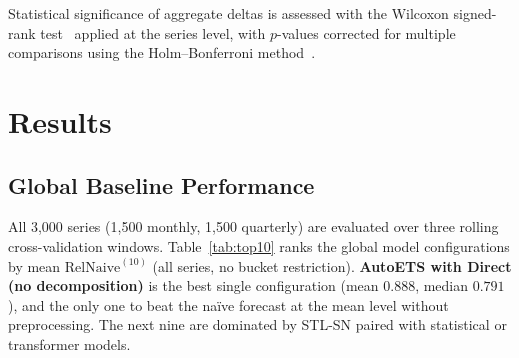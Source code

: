 \documentclass[pdflatex,sn-mathphys-num]{sn-jnl}
\theoremstyle{thmstyleone}
\theoremstyle{thmstyletwo}
\theoremstyle{thmstylethree}
\begin{document}
Statistical significance of aggregate deltas is assessed with the
Wilcoxon signed-rank test~\cite{wilcoxon1945} applied at the series level,
with $p$-values corrected for multiple comparisons using the Holm--Bonferroni
method~\cite{holm1979}.

\section{Results}\label{sec:results}

\subsection{Global Baseline Performance}\label{sec:baseline}

All 3{,}000 series (1{,}500 monthly, 1{,}500 quarterly) are evaluated over three
rolling cross-validation windows.
Table~\ref{tab:top10} ranks the global model configurations by mean
$\mathrm{RelNaive}^{(10)}$ (all series, no bucket restriction).
\textbf{AutoETS with Direct (no decomposition)} is the best single configuration
(mean $0.888$, median $0.791$), and the only one to beat the na\"ive forecast at
the mean level without preprocessing.
The next nine are dominated by STL-SN paired with statistical or transformer
models.
\end{document}
